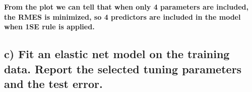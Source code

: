 \documentclass[
]{article}
\newenvironment{Shaded}{\begin{snugshade}}{\end{snugshade}}
\newcommand{\AttributeTok}[1]{\textcolor[rgb]{0.77,0.63,0.00}{#1}}
\newcommand{\CommentTok}[1]{\textcolor[rgb]{0.56,0.35,0.01}{\textit{#1}}}
\newcommand{\DecValTok}[1]{\textcolor[rgb]{0.00,0.00,0.81}{#1}}
\newcommand{\FunctionTok}[1]{\textcolor[rgb]{0.00,0.00,0.00}{#1}}
\newcommand{\NormalTok}[1]{#1}
\newcommand{\OtherTok}[1]{\textcolor[rgb]{0.56,0.35,0.01}{#1}}
\newcommand{\SpecialCharTok}[1]{\textcolor[rgb]{0.00,0.00,0.00}{#1}}
\newcommand{\StringTok}[1]{\textcolor[rgb]{0.31,0.60,0.02}{#1}}
\begin{document}
\begin{Shaded}
\end{Shaded}

\textbf{From the plot we can tell that when only 4 parameters are
included, the RMES is minimized, so 4 predictors are included in the
model when 1SE rule is applied.}

\hypertarget{c-fit-an-elastic-net-model-on-the-training-data.-report-the-selected-tuning-parameters-and-the-test-error.}{%
\subsection{c) Fit an elastic net model on the training data. Report the
selected tuning parameters and the test
error.}\label{c-fit-an-elastic-net-model-on-the-training-data.-report-the-selected-tuning-parameters-and-the-test-error.}}

\begin{Shaded}
\end{Shaded}
\end{document}
